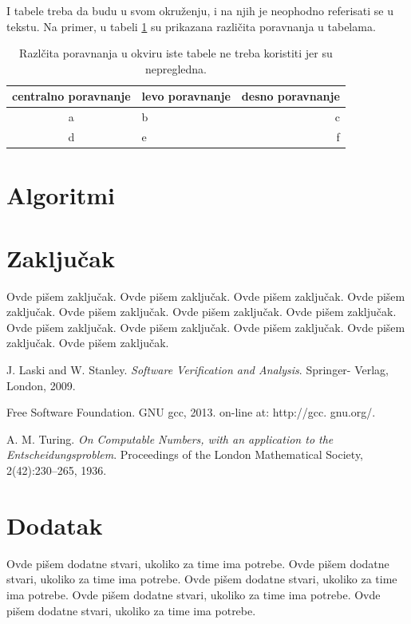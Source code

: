 \documentclass[a4paper]{article}
\begin{document}
\begin{primer} I tabele treba da budu u svom okruženju, i na njih je neophodno referisati se u tekstu. Na primer, u tabeli \ref{tab:tabela1} su prikazana različita poravnanja u tabelama.

\begin{table}[h!]
\begin{center}
\caption{Razlčita poravnanja u okviru iste tabele ne treba koristiti jer su nepregledna.}
\begin{tabular}{|c|l|r|} \hline
centralno poravnanje& levo poravnanje& desno poravnanje\\ \hline
a &b&c\\ \hline
d &e&f\\ \hline
\end{tabular}
\label{tab:tabela1}
\end{center}
\end{table}

\end{primer}

\section{Algoritmi}
\label{sec:algoritmi}

\section{Zaključak}
\label{sec:zakljucak}

Ovde pišem zaključak. 
Ovde pišem zaključak. 
Ovde pišem zaključak. 
Ovde pišem zaključak. 
Ovde pišem zaključak. 
Ovde pišem zaključak. 
Ovde pišem zaključak. 
Ovde pišem zaključak. 
Ovde pišem zaključak. 
Ovde pišem zaključak. 
Ovde pišem zaključak. 
Ovde pišem zaključak. 


\appendix

\begin{thebibliography}{9}

 J. Laski and W. Stanley. \emph{Software Verification and Analysis}. Springer- Verlag, London, 2009.

 Free Software Foundation. GNU gcc, 2013. on-line at: http://gcc. gnu.org/.

 A. M. Turing. \emph{On Computable Numbers, with an application to the Entscheidungsproblem}. Proceedings of the London Mathematical Society, 2(42):230–265, 1936.


\end{thebibliography}


\appendix
\section{Dodatak}
Ovde pišem dodatne stvari, ukoliko za time ima potrebe.
Ovde pišem dodatne stvari, ukoliko za time ima potrebe.
Ovde pišem dodatne stvari, ukoliko za time ima potrebe.
Ovde pišem dodatne stvari, ukoliko za time ima potrebe.
Ovde pišem dodatne stvari, ukoliko za time ima potrebe.
\end{document}
